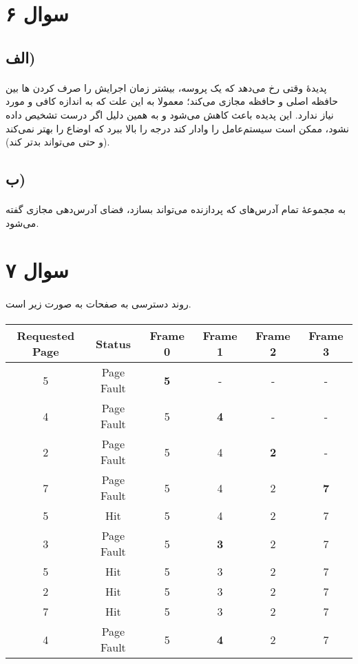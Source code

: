 \documentclass{article}
\begin{document}
	\section*{سوال ۶}
	\subsection*{الف)}
	\paragraph*{}
	پدیدهٔ
	وقتی رخ می‌دهد که یک پروسه، بیشتر زمان اجرایش را صرف
	کردن
	ها
	بین حافظه اصلی و حافظه مجازی می‌کند؛ معمولا به این علت که به اندازه کافی و مورد نیاز
	ندارد. این پدیده باعث کاهش
	می‌شود و به همین دلیل اگر درست تشخیص داده نشود، ممکن است سیستم‌عامل را وادار کند درجه
	را بالا ببرد که اوضاع را بهتر نمی‌کند (و حتی می‌تواند بدتر کند).

	\subsection*{ب)}
	\paragraph*{}
	به مجموعهٔ تمام آدرس‌های
	که پردازنده می‌تواند بسازد، فضای آدرس‌دهی مجازی گفته می‌شود.

	\section*{سوال ۷}
	\paragraph*{}
	روند دسترسی به صفحات به صورت زیر است.
	\paragraph*{}
	\begin{latin}
		\centering
		\begin{tabular}{c|c|c|c|c|c}
			Requested Page & Status & Frame 0 & Frame 1 & Frame 2 & Frame 3 \\
			\hline
			5 & Page Fault & \textbf{5} & - & - & - \\
			\hline
			4 & Page Fault & 5 & \textbf{4} & - & - \\
			\hline
			2 & Page Fault & 5 & 4 & \textbf{2} & - \\
			\hline
			7 & Page Fault & 5 & 4 & 2 & \textbf{7} \\
			\hline
			5 & Hit & 5 & 4 & 2 & 7 \\
			\hline
			3 & Page Fault & 5 & \textbf{3} & 2 & 7 \\
			\hline
			5 & Hit & 5 & 3 & 2 & 7 \\
			\hline
			2 & Hit & 5 & 3 & 2 & 7 \\
			\hline
			7 & Hit & 5 & 3 & 2 & 7 \\
			\hline
			4 & Page Fault & 5 & \textbf{4} & 2 & 7 \\
		\end{tabular}
	\end{latin}
\end{document}
